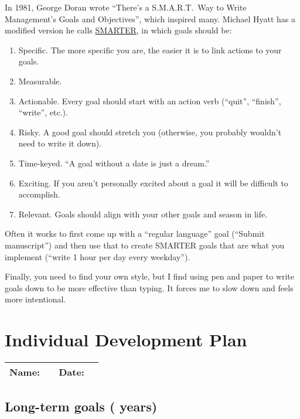 \documentclass[letterpaper,oneside,11pt,article, portrait]{memoir}
\begin{document}
In 1981, George Doran wrote ``There's a S.M.A.R.T.\ Way to Write Management's Goals and Objectives'', which inspired many. Michael Hyatt has a modified version he calls \href{https://fullfocus.co/goal-setting/}{SMARTER}, in which goals should be:
\begin{enumerate}

\item Specific. The more specific you are, the easier it is to link actions to your goals.

\item Measurable.

\item Actionable. Every goal should start with an action verb (``quit'', ``finish'', ``write'', etc.). 

\item Risky. A good goal should stretch you (otherwise, you probably wouldn't need to write it down).

\item Time-keyed. ``A goal without a date is just a dream.''

\item Exciting. If you aren't personally excited about a goal it will be difficult to accomplish.

\item Relevant. Goals should align with your other goals and season in life.

\end{enumerate}

Often it works to first come up with a ``regular language'' goal (``Submit manuscript'') and then use that to create SMARTER goals that are what you implement (``write 1 hour per day every weekday'').

Finally, you need to find your own style, but I find using pen and paper to write goals down to be more effective than typing. It forces me to slow down and feels more intentional.


\clearpage

\section{Individual Development Plan}


\noindent \begin{tabularx}{\textwidth}{ l X l X |}
Name:& &Date:& \\
\hline
\end{tabularx}

\subsection{Long-term goals (\hspace{.5in} years)}
\end{document}
